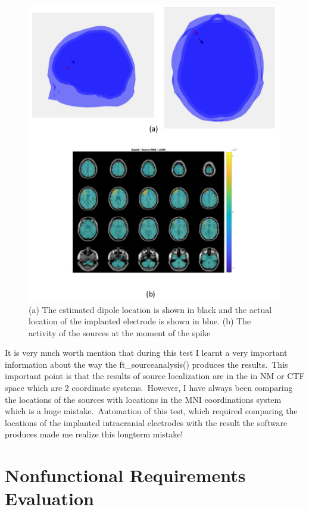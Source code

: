 \documentclass[12pt, titlepage]{article}
\begin{document}
\begin{figure}[H]
\centering
  \includegraphics[scale=0.5]{GTsbj5.png}
  \caption{(a) The estimated dipole location is shown in black and the actual location of the implanted electrode is shown in blue. (b) The activity of the sources at the moment of the spike }
\label{Fig_GTsbj5}
\end{figure}



It is very much worth mention that during this test I learnt a very important information about the way the ft\_sourceanalysis() produces the results.\ This important point is that the results of source localization are in the in NM or CTF space which are 2 coordinate systems.\ However, I have always been comparing the locations of the sources with locations in the MNI coordinations system which is a huge mistake.\ Automation of this test, which required comparing the locations of the implanted intracranial electrodes with the result the software produces made me realize this longterm mistake!\\

\section{Nonfunctional Requirements Evaluation}
\end{document}
